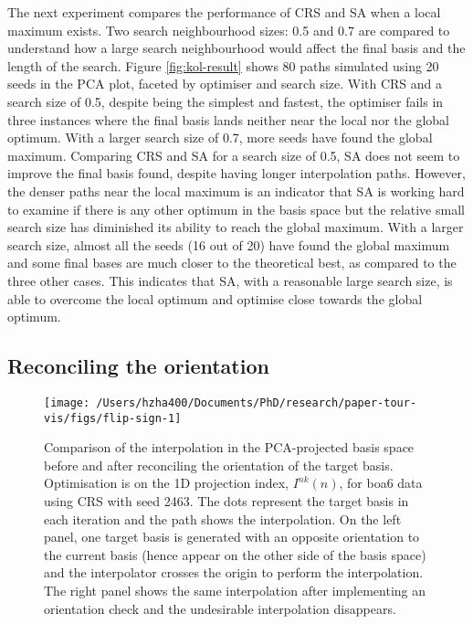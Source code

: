 The next experiment compares the performance of CRS and SA when a local
maximum exists. Two search neighbourhood sizes: 0.5 and 0.7 are compared
to understand how a large search neighbourhood would affect the final
basis and the length of the search. Figure \ref{fig:kol-result} shows 80
paths simulated using 20 seeds in the PCA plot, faceted by optimiser and
search size. With CRS and a search size of 0.5, despite being the
simplest and fastest, the optimiser fails in three instances where the
final basis lands neither near the local nor the global optimum. With a
larger search size of 0.7, more seeds have found the global maximum.
Comparing CRS and SA for a search size of 0.5, SA does not seem to
improve the final basis found, despite having longer interpolation
paths. However, the denser paths near the local maximum is an indicator
that SA is working hard to examine if there is any other optimum in the
basis space but the relative small search size has diminished its
ability to reach the global maximum. With a larger search size, almost
all the seeds (16 out of 20) have found the global maximum and some
final bases are much closer to the theoretical best, as compared to the
three other cases. This indicates that SA, with a reasonable large
search size, is able to overcome the local optimum and optimise close
towards the global optimum.

\hypertarget{reconciling-the-orientation}{%
\subsection{Reconciling the
orientation}\label{reconciling-the-orientation}}

\begin{Schunk}
\begin{figure}

{\centering \texttt{[image: /Users/hzha400/Documents/PhD/research/paper-tour-vis/figs/flip-sign-1]} 

}

\caption[Comparison of the interpolation in the PCA-projected basis space before and after reconciling the orientation of the target basis]{Comparison of the interpolation in the PCA-projected basis space before and after reconciling the orientation of the target basis. Optimisation is on the 1D projection index, $I^{nk}(n)$, for boa6 data using CRS with seed 2463. The dots represent the target basis in each iteration and the path shows the interpolation. On the left panel, one target basis is generated with an opposite orientation to the current basis (hence appear on the other side of the basis space) and the interpolator crosses the origin to perform the interpolation. The right panel shows the same interpolation after implementing an orientation check and the undesirable interpolation disappears.}\label{fig:flip-sign}
\end{figure}
\end{Schunk}

